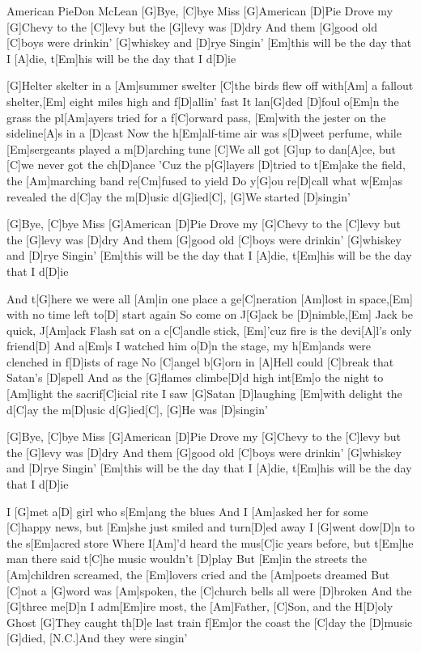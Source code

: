 \documentclass[../main.tex]{subfiles}
\begin{document}
\begin{song}{American Pie}{Don McLean}{}
[G]Bye, [C]bye Miss [G]American [D]Pie
Drove my [G]Chevy to the [C]levy but the [G]levy was [D]dry
And them [G]good old [C]boys were drinkin' [G]whiskey and [D]rye
Singin' [Em]this will be the day that I [A]die, t[Em]his will be the day that I d[D]ie

[G]Helter skelter in a [Am]summer swelter
[C]the birds flew off with[Am] a fallout shelter,[Em] eight miles high and f[D]allin' fast
It lan[G]ded [D]foul o[Em]n the grass
the pl[Am]ayers tried for a f[C]orward pass, [Em]with the jester on the sideline[A]s in a [D]cast
Now the h[Em]alf-time air was s[D]weet perfume, while [Em]sergeants played a m[D]arching tune
[C]We all got [G]up to dan[A]ce, but [C]we never got the ch[D]ance
'Cuz the p[G]layers [D]tried to t[Em]ake the field, the [Am]marching band re[Cm]fused to yield
Do y[G]ou re[D]call what w[Em]as revealed the d[C]ay the m[D]usic d[G]ied[C],  
[G]We started [D]singin'

[G]Bye, [C]bye Miss [G]American [D]Pie
Drove my [G]Chevy to the [C]levy but the [G]levy was [D]dry
And them [G]good old [C]boys were drinkin' [G]whiskey and [D]rye
Singin' [Em]this will be the day that I [A]die, t[Em]his will be the day that I d[D]ie

And t[G]here we were all [Am]in one place
a ge[C]neration [Am]lost in space,[Em] with no time left to[D] start again
So come on J[G]ack be [D]nimble,[Em] Jack be quick, J[Am]ack Flash sat on a c[C]andle
stick, [Em]'cuz fire is the devi[A]l's only friend[D]
And a[Em]s I watched him o[D]n the stage, 
my h[Em]ands were clenched in f[D]ists of rage
No [C]angel b[G]orn in [A]Hell could [C]break that Satan's [D]spell
And as the [G]flames climbe[D]d high int[Em]o the night to [Am]light the sacrif[C]icial rite
I saw [G]Satan [D]laughing [Em]with delight the d[C]ay the m[D]usic d[G]ied[C],  
[G]He was [D]singin'

[G]Bye, [C]bye Miss [G]American [D]Pie
Drove my [G]Chevy to the [C]levy but the [G]levy was [D]dry
And them [G]good old [C]boys were drinkin' [G]whiskey and [D]rye
Singin' [Em]this will be the day that I [A]die, t[Em]his will be the day that I d[D]ie\pagebreak

I [G]met a[D] girl who s[Em]ang the blues
And I [Am]asked her for some [C]happy news, but [Em]she just smiled and turn[D]ed away
I [G]went dow[D]n to the s[Em]acred store
Where I[Am]'d heard the mus[C]ic years before, but t[Em]he man there said t[C]he music wouldn't [D]play
But [Em]in the streets the [Am]children screamed, the [Em]lovers cried and the [Am]poets dreamed
But [C]not a [G]word was [Am]spoken, the [C]church bells all were [D]broken
And the [G]three me[D]n I adm[Em]ire most, the [Am]Father, [C]Son, and the H[D]oly Ghost
[G]They caught th[D]e last train f[Em]or the coast the [C]day the [D]music [G]died,
[N.C.]And they were singin'


\end{song}
\end{document}
